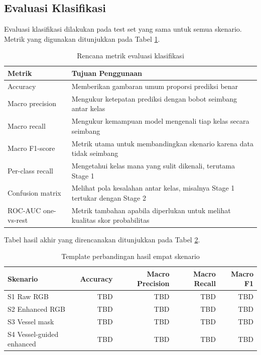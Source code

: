 \documentclass[12pt,a4paper]{article}
\begin{document}
\subsection*{Evaluasi Klasifikasi}

Evaluasi klasifikasi dilakukan pada test set yang sama untuk semua skenario. Metrik yang digunakan ditunjukkan pada Tabel \ref{tab:evaluasi}.

\begin{table}[h]
\centering
\caption{Rencana metrik evaluasi klasifikasi}
\label{tab:evaluasi}
\begin{tabular}{>{\raggedright\arraybackslash}p{4cm} >{\raggedright\arraybackslash}p{9cm}}
\toprule
\textbf{Metrik} & \textbf{Tujuan Penggunaan} \\
\midrule
Accuracy & Memberikan gambaran umum proporsi prediksi benar \\
Macro precision & Mengukur ketepatan prediksi dengan bobot seimbang antar kelas \\
Macro recall & Mengukur kemampuan model mengenali tiap kelas secara seimbang \\
Macro F1-score & Metrik utama untuk membandingkan skenario karena data tidak seimbang \\
Per-class recall & Mengetahui kelas mana yang sulit dikenali, terutama Stage 1 \\
Confusion matrix & Melihat pola kesalahan antar kelas, misalnya Stage 1 tertukar dengan Stage 2 \\
ROC-AUC one-vs-rest & Metrik tambahan apabila diperlukan untuk melihat kualitas skor probabilitas \\
\bottomrule
\end{tabular}
\end{table}

Tabel hasil akhir yang direncanakan ditunjukkan pada Tabel \ref{tab:hasil}.

\begin{table}[h]
\centering
\caption{Template perbandingan hasil empat skenario}
\label{tab:hasil}
\begin{tabular}{l r r r r}
\toprule
\textbf{Skenario} & \textbf{Accuracy} & \textbf{Macro Precision} & \textbf{Macro Recall} & \textbf{Macro F1} \\
\midrule
S1 Raw RGB & TBD & TBD & TBD & TBD \\
S2 Enhanced RGB & TBD & TBD & TBD & TBD \\
S3 Vessel mask & TBD & TBD & TBD & TBD \\
S4 Vessel-guided enhanced & TBD & TBD & TBD & TBD \\
\bottomrule
\end{tabular}
\end{table}
\end{document}

